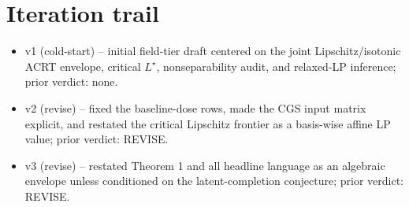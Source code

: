\documentclass[11pt]{article}
\theoremstyle{definition}
\theoremstyle{plain}
\theoremstyle{remark}
\begin{document}
\section{Iteration trail}
\begin{itemize}[leftmargin=*]
  \item v1 (cold-start) -- initial field-tier draft centered on the joint Lipschitz/isotonic ACRT envelope, critical \(L^\star\), nonseparability audit, and relaxed-LP inference; prior verdict: none.
  \item v2 (revise) -- fixed the baseline-dose rows, made the CGS input matrix explicit, and restated the critical Lipschitz frontier as a basis-wise affine LP value; prior verdict: REVISE.
  \item v3 (revise) -- restated Theorem 1 and all headline language as an algebraic envelope unless conditioned on the latent-completion conjecture; prior verdict: REVISE.
\end{itemize}
\end{document}
